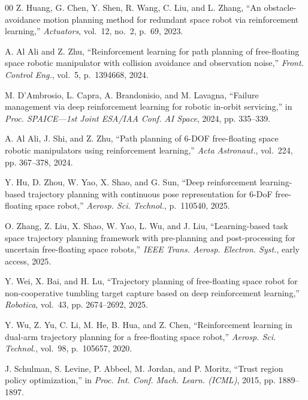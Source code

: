 \documentclass{ieeeaccess}
\begin{document}
\begin{thebibliography}{00}
Z. Huang, G. Chen, Y. Shen, R. Wang, C. Liu, and L. Zhang, ``An
obstacle-avoidance motion planning method for redundant space robot via reinforcement learning,'' \emph{Actuators}, vol.~12, no.~2,
p.~69, 2023.



A. Al Ali and Z. Zhu, ``Reinforcement learning for path planning of free-floating space
robotic manipulator with collision avoidance and observation noise,'' \emph{Front. Control Eng.}, vol.~5, p.~1394668, 2024.



M. D'Ambrosio, L. Capra, A. Brandonisio, and M. Lavagna, ``Failure management via deep reinforcement
learning for robotic in-orbit servicing,'' in \emph{Proc. SPAICE---1st Joint ESA/IAA Conf. AI Space}, 2024,
pp. 335--339.



A. Al Ali, J. Shi, and Z. Zhu, ``Path planning of 6-DOF free-floating space
robotic manipulators using reinforcement learning,'' \emph{Acta Astronaut.}, vol.~224, pp. 367--378, 2024.



Y. Hu, D. Zhou, W. Yao, X. Shao, and G. Sun, ``Deep reinforcement learning-based
trajectory planning with continuous pose representation for 6-DoF free-floating space robot,'' \emph{Aerosp. Sci. Technol.},
p.~110540, 2025.



O. Zhang, Z. Liu, X. Shao, W. Yao, L. Wu, and J. Liu, ``Learning-based
task space trajectory planning framework with pre-planning and post-processing for uncertain free-floating space robots,''
\emph{IEEE Trans. Aerosp. Electron. Syst.}, early access, 2025.



Y. Wei, X. Bai, and H. Lu, ``Trajectory planning of free-floating space robot for
non-cooperative tumbling target capture based on deep reinforcement learning,'' \emph{Robotica}, vol.~43, pp. 2674--2692, 2025.



Y. Wu, Z. Yu, C. Li, M. He, B. Hua, and Z. Chen, ``Reinforcement
learning in dual-arm trajectory planning for a free-floating space robot,'' \emph{Aerosp. Sci. Technol.}, vol.~98,
p.~105657, 2020.



J. Schulman, S. Levine, P. Abbeel, M. Jordan, and P. Moritz, ``Trust region policy
optimization,'' in \emph{Proc. Int. Conf. Mach. Learn. (ICML)}, 2015, pp. 1889--1897.




\end{thebibliography}
\end{document}
